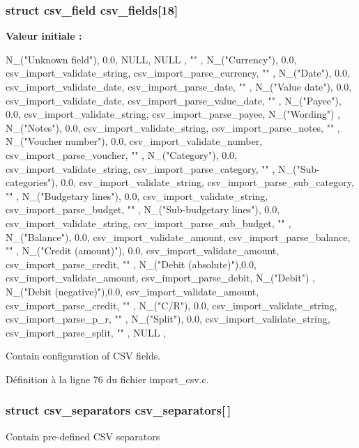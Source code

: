 \subsubsection[{csv\_\-fields}]{\setlength{\rightskip}{0pt plus 5cm}struct {\bf csv\_\-field} {\bf csv\_\-fields}[18]}\label{import__csv_8c_a81ae9ca5d9bdfead2bafc0f0e8ffb850}
{\bfseries Valeur initiale :}
\begin{DoxyCode}
 {
    { N_("Unknown field"),  0.0, NULL,                       NULL                
          , "" },
    { N_("Currency"),       0.0, csv_import_validate_string, 
      csv_import_parse_currency, "" },
    { N_("Date"),           0.0, csv_import_validate_date,   
      csv_import_parse_date, "" },
    { N_("Value date"),     0.0, csv_import_validate_date,   
      csv_import_parse_value_date, "" },
    { N_("Payee"),          0.0, csv_import_validate_string, 
      csv_import_parse_payee, N_("Wording") },
    { N_("Notes"),          0.0, csv_import_validate_string, 
      csv_import_parse_notes, "" },
    { N_("Voucher number"), 0.0, csv_import_validate_number, 
      csv_import_parse_voucher, "" },
    { N_("Category"),       0.0, csv_import_validate_string, 
      csv_import_parse_category, "" },
    { N_("Sub-categories"),   0.0, csv_import_validate_string, 
      csv_import_parse_sub_category, "" },
        { N_("Budgetary lines"), 0.0, csv_import_validate_string, 
      csv_import_parse_budget, "" },
        { N_("Sub-budgetary lines"), 0.0, csv_import_validate_string, 
      csv_import_parse_sub_budget, "" },
    { N_("Balance"),        0.0, csv_import_validate_amount, 
      csv_import_parse_balance, "" },
    { N_("Credit (amount)"), 0.0, csv_import_validate_amount, 
      csv_import_parse_credit, "" },
    { N_("Debit (absolute)"),0.0, csv_import_validate_amount, 
      csv_import_parse_debit, N_("Debit") },
    { N_("Debit (negative)"),0.0, csv_import_validate_amount, 
      csv_import_parse_credit, "" },
    { N_("C/R"),            0.0, csv_import_validate_string, 
      csv_import_parse_p_r, "" },
    { N_("Split"),          0.0, csv_import_validate_string, 
      csv_import_parse_split, "" },
    { NULL },
}
\end{DoxyCode}
Contain configuration of CSV fields. 

Définition à la ligne 76 du fichier import\_\-csv.c.

\subsubsection[{csv\_\-separators}]{\setlength{\rightskip}{0pt plus 5cm}struct {\bf csv\_\-separators}  {\bf csv\_\-separators}[$\,$]}\label{import__csv_8c_abe865dd8fe4f2c2347aec4af0aeca980}
Contain pre-\/defined CSV separators 
